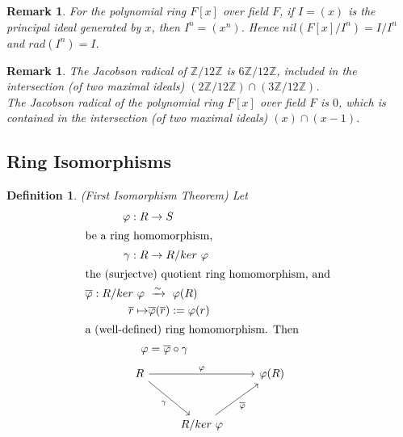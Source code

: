 \documentclass[a4paper,8pt]{article}
\theoremstyle{theorem}
\newtheorem{definition}[theorem]{Definition}
\newtheorem{remark}[theorem]{Remark}
\begin{document}
\begin{remark}
For the polynomial ring $F[x]$ over field $F$, if $I=(x)$ is the principal ideal generated by $x$, then $I^n = (x^n)$. Hence $nil(F[x]/I^n)=I/I^n$	and $rad(I^n) = I$.
\end{remark}


\begin{remark}
The Jacobson radical of $\mathbb{Z}/12\mathbb{Z}$ is $6\mathbb{Z}/12\mathbb{Z}$, included in the intersection (of two maximal ideals) $(2\mathbb{Z}/12\mathbb{Z}) \cap (3\mathbb{Z}/12\mathbb{Z})$.\\
The Jacobson radical of the polynomial ring $F[x]$ over field $F$ is $0$, which is contained in the intersection (of two maximal ideals) $(x) \cap (x-1)$.\\
\end{remark}


\subsection{Ring Isomorphisms}

\begin{definition}
\textit{{\color{blue} (First Isomorphism Theorem)}} Let 
\begin{align}
\varphi: R &\rightarrow S \nonumber \\
\intertext{be a ring homomorphism, }
\gamma: R &\rightarrow R/ker \ \varphi \nonumber \\
\intertext{the (surjectve) quotient ring homomorphism, and }
\overline{\varphi}: R/ker \ \varphi \ &\xrightarrow{\sim} \ \varphi(R) \nonumber \\
\overline{r} \mapsto &\overline{\varphi}(\overline{r}) := \varphi(r) \nonumber \\
\intertext{a (well-defined) ring homomorphism. Then}
\varphi &= \overline{\varphi} \circ \gamma \nonumber
\end{align}
\begin{equation}\label{diagram}
\begin{tikzcd}
R \arrow{rr}{\varphi} \arrow[swap]{dr}{\gamma} & & \varphi(R) \\[10pt]
    & R/ker \ \varphi \arrow[swap]{ur}{\overline{\varphi}}
\end{tikzcd} \nonumber
\end{equation}	
\end{definition}
\end{document}
